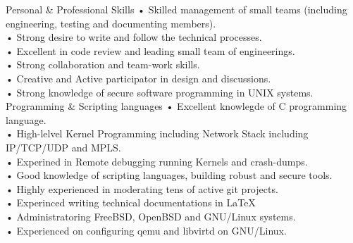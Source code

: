 \documentclass[12pt]{developercv}
\begin{document}
\begin{entrylist}
	\entry
		{}
		{Personal \& Professional Skills}
		{}
		{
			• Skilled management of small teams (including engineering, testing and documenting members).\\
			• Strong desire to write and follow the technical processes.\\
			• Excellent in code review and leading small team of engineerings.\\
			• Strong collaboration and team-work skills.\\
			• Creative and Active participator in design and discussions.\\
			• Strong knowledge of secure software programming in UNIX systems.
		}
	\entry
		{}
		{Programming \& Scripting languages}
		{}
		{
			• Excellent knowlegde of C programming language.\\
			• High-lelvel Kernel Programming including Network Stack including IP/TCP/UDP and MPLS.\\
			• Experined in Remote debugging running Kernels and crash-dumps.\\
			• Good knowledge of scripting languages, building robust and secure tools.\\
			• Highly experienced in moderating tens of active git projects.\\
			• Experinced writing technical documentations in \LaTeX\\
			• Administratoring FreeBSD, OpenBSD and GNU/Linux systems.\\
			• Experienced on configuring qemu and libvirtd on GNU/Linux.\\
		}
\end{entrylist}
\end{document}
